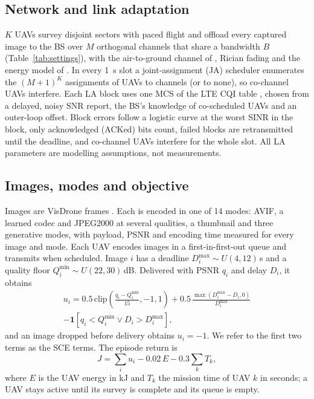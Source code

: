 \documentclass[final,3p,times,twocolumn]{elsarticle}
\begin{document}
\subsection{Network and link adaptation}
$K$ UAVs survey disjoint sectors with paced flight and offload every captured image to the BS over $M$ orthogonal
channels that share a bandwidth $B$ (Table~\ref{tab:settings}), with the air-to-ground channel of \cite{alhourani2014},
Rician fading and the energy model of \cite{zeng2019}. In every \SI{1}{s} slot a joint-assignment (JA) scheduler
enumerates the $(M{+}1)^K$ assignments of UAVs to channels (or to none), so co-channel UAVs interfere. Each LA block
uses one MCS of the LTE CQI table \cite{3gpp36213}, chosen from a delayed, noisy SNR report, the BS's knowledge of
co-scheduled UAVs and an outer-loop offset. Block errors follow a logistic curve at the worst SINR in the block, only
acknowledged (ACKed) bits count, failed blocks are retransmitted until the deadline, and co-channel UAVs interfere
for the whole slot. All LA parameters are modelling assumptions, not measurements.

\subsection{Images, modes and objective}
Images are VisDrone frames \cite{visdrone}. Each is encoded in one of 14 modes: AVIF, a learned codec
\cite{minnen2018} and JPEG2000 at several qualities, a thumbnail and three generative modes, with payload, PSNR and
encoding time measured for every image and mode. Each UAV encodes images in a first-in-first-out queue and transmits
when scheduled. Image $i$ has a deadline $D_i^{\max}\sim U(4,12)$\,s and a quality floor $Q_i^{\min}\sim
U(22,30)$\,dB. Delivered with PSNR $q_i$ and delay $D_i$, it obtains
\begin{multline}\label{eq:u}
u_i = 0.5\,\mathrm{clip}\!\left(\tfrac{q_i-Q_i^{\min}}{15},-1,1\right) + 0.5\,\tfrac{\max(D_i^{\max}-D_i,0)}{D_i^{\max}}\\
- \mathbf{1}\!\left[q_i<Q_i^{\min} \lor D_i>D_i^{\max}\right],
\end{multline}
and an image dropped before delivery obtains $u_i=-1$. We refer to the first two terms as the SCE terms. The episode
return is
\begin{equation}\label{eq:J}
J=\textstyle\sum_i u_i-0.02\,E-0.3\sum_k T_k,
\end{equation}
where $E$ is the UAV energy in kJ and $T_k$ the mission time of UAV $k$ in seconds; a UAV stays active until its
survey is complete and its queue is empty.
\end{document}
